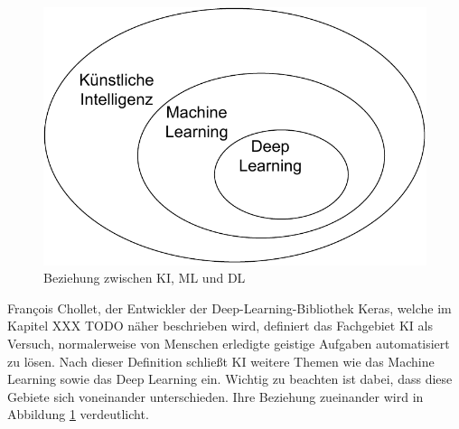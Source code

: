 \begin{figure}
    \includegraphics[width=\textwidth/2]{abbildungen/KI_ML_DL.pdf}
    \caption{Beziehung zwischen \ac{KI}, \ac{ML} und \ac{DL}}
    \label{fig:KI_ML_DL}

\end{figure} 

François Chollet, der Entwickler der Deep-Learning-Bibliothek Keras, welche im Kapitel XXX TODO näher beschrieben wird, definiert
das Fachgebiet \ac{KI} als \glqq [den] Versuch, normalerweise von Menschen erledigte geistige Aufgaben automatisiert zu lösen\grqq \cite[S.22]{DL_PY}.
Nach dieser Definition schließt \ac{KI} weitere Themen wie das Machine Learning sowie das Deep Learning ein. Wichtig zu beachten ist dabei,
dass diese Gebiete sich voneinander unterschieden. Ihre Beziehung zueinander wird in Abbildung \ref*{fig:KI_ML_DL} verdeutlicht.

